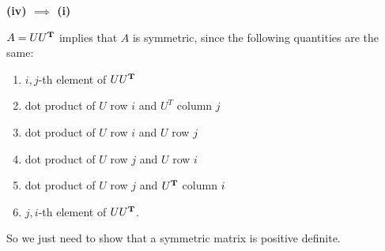 \documentclass{article}
\begin{document}
\begin{enumerate}[label=(\alph*)]
\begin{mdframed}
      \textbf{(iv) $\implies$ (i)}

      $A = UU^{\mathbf{T}}$ implies that $A$ is symmetric, since the following quantities are the same:
      \begin{enumerate}
      \item $i,j$-th element of $UU^{\mathbf{T}}$
      \item dot product of $U$ row $i$ and $U^T$ column $j$
      \item dot product of $U$ row $i$ and $U$ row $j$
      \item dot product of $U$ row $j$ and $U$ row $i$
      \item dot product of $U$ row $j$ and $U^{\mathbf{T}}$ column $i$
      \item $j,i$-th element of $UU^{\mathbf{T}}$.
      \end{enumerate}

      So we just need to show that a symmetric matrix is positive definite.
    \end{mdframed}


\end{enumerate}
\end{document}
